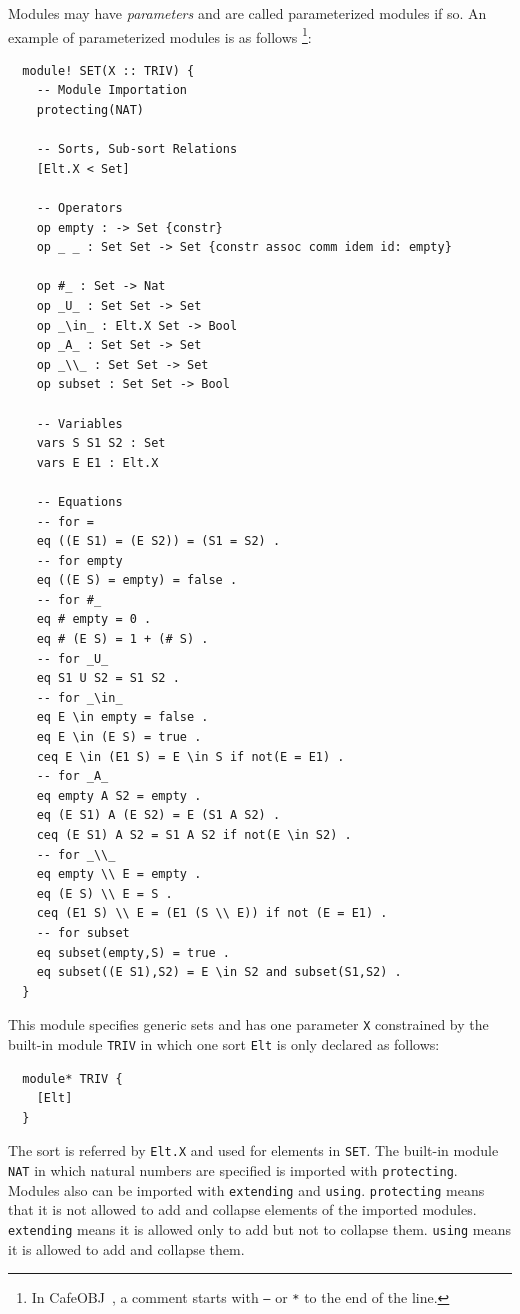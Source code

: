 \documentclass[12pt]{report}
\newcommand{\cafeobj}{{\sf CafeOBJ}~}
\begin{document}
Modules may have {\it parameters} and are called parameterized modules
if so. An example of parameterized modules is as follows
\footnote{In \cafeobj, a comment starts with {\tt --} or {\tt **} to
  the end of the line.}:
\small
\begin{verbatim}
  module! SET(X :: TRIV) {
    -- Module Importation
    protecting(NAT)
  
    -- Sorts, Sub-sort Relations
    [Elt.X < Set]
  
    -- Operators
    op empty : -> Set {constr}
    op _ _ : Set Set -> Set {constr assoc comm idem id: empty}
  
    op #_ : Set -> Nat
    op _U_ : Set Set -> Set
    op _\in_ : Elt.X Set -> Bool
    op _A_ : Set Set -> Set
    op _\\_ : Set Set -> Set
    op subset : Set Set -> Bool
  
    -- Variables
    vars S S1 S2 : Set
    vars E E1 : Elt.X
  
    -- Equations
    -- for =
    eq ((E S1) = (E S2)) = (S1 = S2) .
    -- for empty
    eq ((E S) = empty) = false .
    -- for #_
    eq # empty = 0 .   
    eq # (E S) = 1 + (# S) . 
    -- for _U_
    eq S1 U S2 = S1 S2 .
    -- for _\in_
    eq E \in empty = false .
    eq E \in (E S) = true .
    ceq E \in (E1 S) = E \in S if not(E = E1) .
    -- for _A_
    eq empty A S2 = empty .
    eq (E S1) A (E S2) = E (S1 A S2) .
    ceq (E S1) A S2 = S1 A S2 if not(E \in S2) .
    -- for _\\_ 
    eq empty \\ E = empty .
    eq (E S) \\ E = S .
    ceq (E1 S) \\ E = (E1 (S \\ E)) if not (E = E1) .
    -- for subset
    eq subset(empty,S) = true .
    eq subset((E S1),S2) = E \in S2 and subset(S1,S2) .
  }
\end{verbatim}
\normalsize
This module specifies generic sets and has one parameter {\tt X}
constrained by the built-in module {\tt TRIV} in which one sort
{\tt Elt} is only declared as follows:
\small
\begin{verbatim}
  module* TRIV {
    [Elt]
  }
\end{verbatim}
\normalsize
The sort is referred by {\tt Elt.X} and used for elements in
{\tt SET}. The built-in module {\tt NAT} in which natural numbers are
specified is imported with {\tt protecting}. Modules also can be
imported with {\tt extending} and {\tt using}. {\tt protecting} means
that it is not allowed to add and collapse elements of the imported
modules.  {\tt extending} means it is allowed only to add but not to
collapse them. {\tt using} means it is allowed to add and collapse
them.
\end{document}
